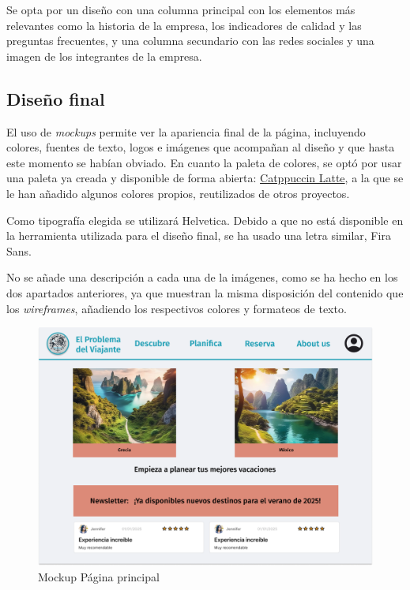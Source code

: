 \documentclass[11pt, a4paper]{book}
\begin{document}
	Se opta por un diseño con una columna principal con los elementos más relevantes como la historia de la empresa, los indicadores de calidad y las preguntas frecuentes, y una columna secundario con las redes sociales y una imagen de los integrantes de la empresa.
	
	
	
	\subsection{Diseño final}
	El uso de \textit{mockups} permite ver la apariencia final de la página, incluyendo colores, fuentes de texto, logos e imágenes que acompañan al diseño y que hasta este momento se habían obviado. En cuanto la paleta de colores, se optó por usar una paleta ya creada y disponible de forma abierta: \href{https://github.com/catppuccin/catppuccin?tab=readme-ov-file#-palette}{Catppuccin Latte}, a la que se le han añadido algunos colores propios, reutilizados de otros proyectos.
	
	Como tipografía elegida se utilizará Helvetica. Debido a que no está disponible en la herramienta utilizada para el diseño final, se ha usado una letra similar, Fira Sans.
	
	No se añade una descripción a cada una de la imágenes, como se ha hecho en los dos apartados anteriores, ya que muestran la misma disposición del contenido que los \textit{wireframes}, añadiendo los respectivos colores y formateos de texto.
	
	\begin{figure} [H]
		\centering
		\includegraphics[width=\textwidth]{mockup-principal.png}
		\caption{Mockup Página principal}
	\end{figure}
\end{document}
